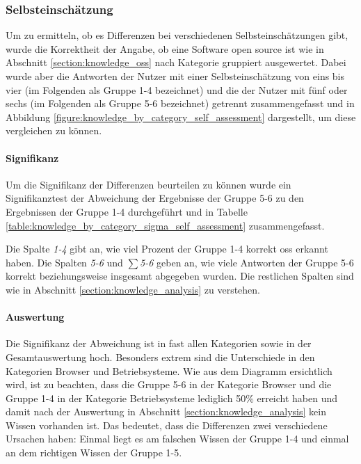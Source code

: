 \documentclass[a4paper]{article}
\begin{document}
            \subsubsection{Selbsteinschätzung}
                Um zu ermitteln, ob es Differenzen bei verschiedenen Selbsteinschätzungen gibt, wurde die Korrektheit der Angabe, ob eine Software open source ist wie in Abschnitt \ref{section:knowledge_oss} nach Kategorie gruppiert ausgewertet. Dabei wurde aber die Antworten der Nutzer mit einer Selbsteinschätzung von eins bis vier (im Folgenden als Gruppe 1-4 bezeichnet) und die der Nutzer mit fünf oder sechs (im Folgenden als Gruppe 5-6 bezeichnet) getrennt zusammengefasst und in Abbildung \ref{figure:knowledge_by_category_self_assessment} dargestellt, um diese vergleichen zu können.
                
                \paragraph{Signifikanz}
                    Um die Signifikanz der Differenzen beurteilen zu können wurde ein Signifikanztest der Abweichung der Ergebnisse der Gruppe 5-6 zu den Ergebnissen der Gruppe 1-4 durchgeführt und in Tabelle \ref{table:knowledge_by_category_sigma_self_assessment} zusammengefasst.
                    
                    Die Spalte \emph{1-4} gibt an, wie viel Prozent der Gruppe 1-4 korrekt \gls{oss} erkannt haben. Die Spalten \emph{5-6} und \emph{$\sum$5-6} geben an, wie viele Antworten der Gruppe 5-6 korrekt beziehungsweise insgesamt abgegeben wurden. Die restlichen Spalten sind wie in Abschnitt \ref{section:knowledge_analysis} zu verstehen.
                        
                \paragraph{Auswertung}
                    Die Signifikanz der Abweichung ist in fast allen Kategorien sowie in der Gesamtauswertung hoch. Besonders extrem sind die Unterschiede in den Kategorien Browser und Betriebsysteme. Wie aus dem Diagramm ersichtlich wird, ist zu beachten, dass die Gruppe 5-6 in der Kategorie Browser und die Gruppe 1-4 in der Kategorie Betriebsysteme lediglich 50\% erreicht haben und damit nach der Auswertung in Abschnitt \ref{section:knowledge_analysis} kein Wissen vorhanden ist. Das bedeutet, dass die Differenzen zwei verschiedene Ursachen haben: Einmal liegt es am falschen Wissen der Gruppe 1-4 und einmal an dem richtigen Wissen der Gruppe 1-5.
                    
\end{document}
